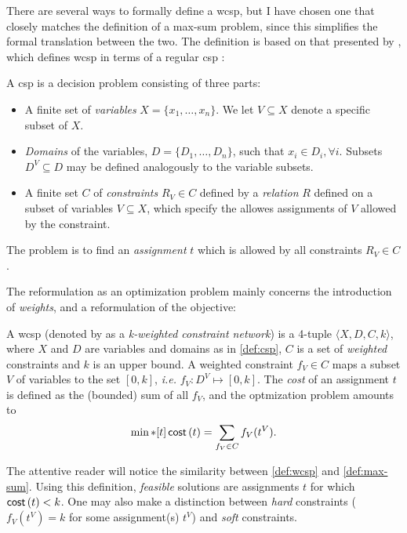There are several ways to formally define a \gls{wcsp}, but I have chosen one that closely matches the definition of a max-sum problem, since this simplifies the formal translation between the two. The definition is based on that presented by \textcite{Meseguer06}, which defines \gls{wcsp} \parencite[\pno~284]{Meseguer06} in terms of a regular \gls{csp} \parencite[\pno~281]{Meseguer06}:
\begin{definition} \label{def:csp}
	A \gls{csp} is a decision problem consisting of three parts:
	\begin{itemize}
		\item A finite set of \emph{variables} \(X = \{x_1, \dotsc, x_n\}\). We let \(V \subseteq X\) denote a specific subset of \(X\).
		\item \emph{Domains} of the variables, \(D = \{D_1, \dotsc, D_n\}\), such that \(x_i \in D_i, \forall i\). Subsets \(D^V \subseteq D\) may be defined analogously to the variable subsets.
		\item A finite set \(C\) of \emph{constraints} \(R_V\in C\) defined by a \emph{relation} \(R\) defined on a subset of variables \(V\subseteq X\), which specify the allowes assignments of \(V\) allowed by the constraint.
	\end{itemize}
	The problem is to find an \emph{assignment} \(t\) which is allowed by all constraints \(R_V\in C\).
\end{definition}

The reformulation as an optimization problem mainly concerns the introduction of \emph{weights}, and a reformulation of the objective:
\begin{definition} \label{def:wcsp}
	A \gls{wcsp} (denoted by \textcite[\pno~284]{Meseguer06} as a \emph{k-weighted constraint network}) is a 4-tuple \(\langle X, D, C, k\rangle\), where \(X\) and \(D\) are variables and domains as in \cref{def:csp}, \(C\) is a set of \emph{weighted} constraints and \(k\) is an upper bound.
	A weighted constraint \(f_V\in C\) maps a subset \(V\) of variables to the set \([0,k]\), \emph{i.e.} \(f_V : D^V \mapsto [0,k]\).
	The \emph{cost} of an assignment \(t\) is defined as the (bounded) sum of all \(f_V\), and the optmization problem amounts to
	\begin{equation*}
		\min*[t] \operatorname{\mathsf{cost}}\left(t\right) = \sum_{f_V\in C} f_V(t^V).
	\end{equation*}
\end{definition}

The attentive reader will notice the similarity between \cref{def:wcsp} and \cref{def:max-sum}. 
Using this definition, \emph{feasible} solutions are assignments \(t\) for which \(\operatorname{\mathsf{cost}}\left(t\right) < k\).
One may also make a distinction between \emph{hard} constraints (\(f_V(t^V) = k\) for some assignment(s) \(t^V\)) and \emph{soft} constraints.

